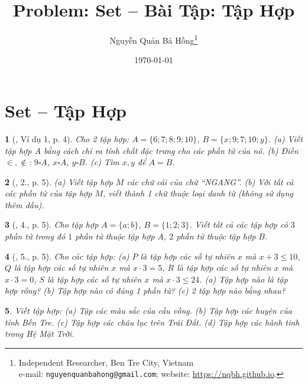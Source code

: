 \documentclass{article}
\title{Problem: Set -- Bài Tập: Tập Hợp}
\author{Nguyễn Quản Bá Hồng\footnote{Independent Researcher, Ben Tre City, Vietnam\\e-mail: \texttt{nguyenquanbahong@gmail.com}; website: \url{https://nqbh.github.io}.}}
\date{\today}
\newtheorem{baitoan}{}
\begin{document}
\maketitle
\tableofcontents


\section{Set -- Tập Hợp}

\begin{baitoan}[\cite{Tuyen_Toan_6}, Ví dụ 1, p. 4]
	Cho 2 tập hợp: $A = \{6;7;8;9;10\}$, $B = \{x;9;7;10;y\}$. (a) Viết tập hợp $A$ bằng cách chỉ ra tính chất đặc trưng cho các phần tử của nó. (b) Điền $\in,\notin$: $9\square A$, $x\square A$, $y\square B$. (c) Tìm $x,y$ để $A = B$.
\end{baitoan}

\begin{baitoan}[\cite{Tuyen_Toan_6}, 2., p. 5]
	(a) Viết tập hợp $M$ các chữ cái của chữ ``NGANG''. (b) Với tất cả các phần tử của tập hợp $M$, viết thành 1 chữ thuộc loại danh từ (không sử dụng thêm dấu).
\end{baitoan}

\begin{baitoan}[\cite{Tuyen_Toan_6}, 4., p. 5]
	Cho tập hợp $A = \{a;b\}$, $B = \{1;2;3\}$. Viết tất cả các tập hợp có $3$ phần tử trong đó $1$ phần tử thuộc tập hợp $A$, $2$ phần tử thuộc tập hợp $B$.
\end{baitoan}

\begin{baitoan}[\cite{Tuyen_Toan_6}, 5., p. 5]
	Cho các tập hợp: (a) $P$ là tập hợp các số tự nhiên $x$ mà $x + 3\le10$, $Q$ là tập hợp các số tự nhiên $x$ mà $x\cdot3 = 5$, $R$ là tập hợp các số tự nhiên $x$ mà $x\cdot3 = 0$, $S$ là tập hợp các số tự nhiên $x$ mà $x\cdot3\le24$. (a) Tập hợp nào là tập hợp rỗng? (b) Tập hợp nào có đúng 1 phần tử? (c) 2 tập hợp nào bằng nhau?
\end{baitoan}

\begin{baitoan}
	Viết tập hợp: (a) Tập các màu sắc của cầu vồng. (b) Tập hợp các huyện của tỉnh Bến Tre. (c) Tập hợp các châu lục trên Trái Đất. (d) Tập hợp các hành tinh trong Hệ Mặt Trời.
\end{baitoan}
\end{document}
